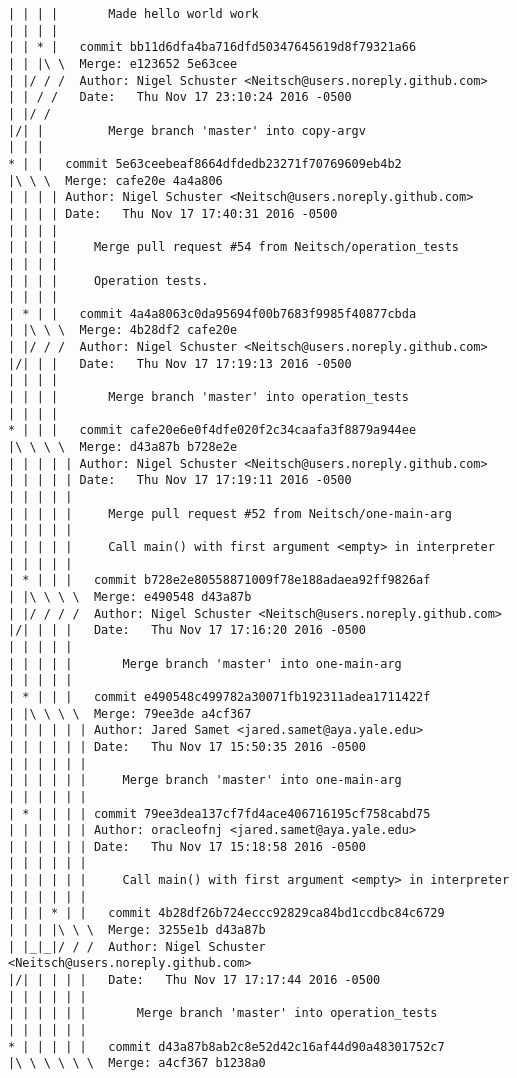 \begin{lstlisting}
| | | |       Made hello world work
| | | |       
| | * |   commit bb11d6dfa4ba716dfd50347645619d8f79321a66
| | |\ \  Merge: e123652 5e63cee
| |/ / /  Author: Nigel Schuster <Neitsch@users.noreply.github.com>
| | / /   Date:   Thu Nov 17 23:10:24 2016 -0500
| |/ /    
|/| |         Merge branch 'master' into copy-argv
| | |      
* | |   commit 5e63ceebeaf8664dfdedb23271f70769609eb4b2
|\ \ \  Merge: cafe20e 4a4a806
| | | | Author: Nigel Schuster <Neitsch@users.noreply.github.com>
| | | | Date:   Thu Nov 17 17:40:31 2016 -0500
| | | | 
| | | |     Merge pull request #54 from Neitsch/operation_tests
| | | |     
| | | |     Operation tests.
| | | |       
| * | |   commit 4a4a8063c0da95694f00b7683f9985f40877cbda
| |\ \ \  Merge: 4b28df2 cafe20e
| |/ / /  Author: Nigel Schuster <Neitsch@users.noreply.github.com>
|/| | |   Date:   Thu Nov 17 17:19:13 2016 -0500
| | | |   
| | | |       Merge branch 'master' into operation_tests
| | | |       
* | | |   commit cafe20e6e0f4dfe020f2c34caafa3f8879a944ee
|\ \ \ \  Merge: d43a87b b728e2e
| | | | | Author: Nigel Schuster <Neitsch@users.noreply.github.com>
| | | | | Date:   Thu Nov 17 17:19:11 2016 -0500
| | | | | 
| | | | |     Merge pull request #52 from Neitsch/one-main-arg
| | | | |     
| | | | |     Call main() with first argument <empty> in interpreter
| | | | |        
| * | | |   commit b728e2e80558871009f78e188adaea92ff9826af
| |\ \ \ \  Merge: e490548 d43a87b
| |/ / / /  Author: Nigel Schuster <Neitsch@users.noreply.github.com>
|/| | | |   Date:   Thu Nov 17 17:16:20 2016 -0500
| | | | |   
| | | | |       Merge branch 'master' into one-main-arg
| | | | |        
| * | | |   commit e490548c499782a30071fb192311adea1711422f
| |\ \ \ \  Merge: 79ee3de a4cf367
| | | | | | Author: Jared Samet <jared.samet@aya.yale.edu>
| | | | | | Date:   Thu Nov 17 15:50:35 2016 -0500
| | | | | | 
| | | | | |     Merge branch 'master' into one-main-arg
| | | | | |       
| * | | | | commit 79ee3dea137cf7fd4ace406716195cf758cabd75
| | | | | | Author: oracleofnj <jared.samet@aya.yale.edu>
| | | | | | Date:   Thu Nov 17 15:18:58 2016 -0500
| | | | | | 
| | | | | |     Call main() with first argument <empty> in interpreter
| | | | | |         
| | | * | |   commit 4b28df26b724eccc92829ca84bd1ccdbc84c6729
| | | |\ \ \  Merge: 3255e1b d43a87b
| |_|_|/ / /  Author: Nigel Schuster <Neitsch@users.noreply.github.com>
|/| | | | |   Date:   Thu Nov 17 17:17:44 2016 -0500
| | | | | |   
| | | | | |       Merge branch 'master' into operation_tests
| | | | | |         
* | | | | |   commit d43a87b8ab2c8e52d42c16af44d90a48301752c7
|\ \ \ \ \ \  Merge: a4cf367 b1238a0

\end{lstlisting}
